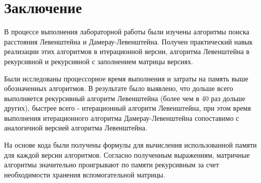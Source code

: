 \documentclass[a4paper,oneside,14pt]{extreport}
\begin{document}
\chapter*{Заключение}
В процессе выполнения лабораторной работы были изучены алгоритмы поиска расстояния Левенштейна и Дамерау-Левенштейна. Получен практический навык реализации этих алгоритмов в итерационной версии, алгоритма Левенштейна в рекурсивной и рекурсивной с заполнением матрицы версиях.

Были исследованы процессорное время выполнения и затраты на память выше обозначенных алгоритмов. В результате было выявлено, что дольше всего выполняется рекурсивный алгоритм Левенштейна (более чем в 40 раз дольше других), быстрее всего - итерационный алгоритм Левенштейна, при этом время выполнения итерационного алгоритма Дамерау-Левенштейна сопоставимо с аналогичной версией алгоритма Левенштейна. 

На основе кода были получены формулы для вычисления использованной памяти для каждой версии алгоритмов. Согласно полученным выражениям, матричные алгоритмы значительно проигрывают по памяти рекурсивным за счет необходимости хранения вспомогательной матрицы.


\newpage
{}



\nocite{*}
\end{document}

